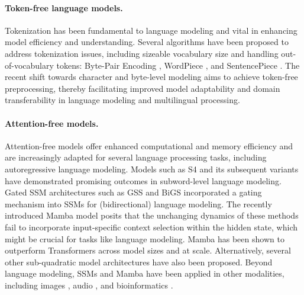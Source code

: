 \paragraph{Token-free language models.} Tokenization has been fundamental to language modeling and vital in enhancing model efficiency and understanding. Several algorithms have been proposed to address tokenization issues, including sizeable vocabulary size and handling out-of-vocabulary tokens: Byte-Pair Encoding \citep{sennrich2015neural}, WordPiece \citep{schuster2012japanese,devlin2018bert}, and SentencePiece \citep{kudo2018sentencepiece}. The recent shift towards character \citep{tay2022charformer,ma2020charbert,mielke2019spell} and byte-level \citep{yu2023megabyte,xue2022byt5,belouadi2022bygpt5} modeling aims to achieve token-free preprocessing, thereby facilitating improved model adaptability and domain transferability in language modeling and multilingual processing.

\paragraph{Attention-free models.} Attention-free models offer enhanced computational and memory efficiency and are increasingly adapted for several language processing tasks, including autoregressive language modeling. Models such as S4 \citep{gu2021efficiently} and its subsequent variants \citep{gupta2022diagonal,gu2022parameterization} have demonstrated promising outcomes in subword-level language modeling. Gated SSM architectures such as GSS \citep{mehta2023long} and BiGS \cite{wang2022pretraining} incorporated a gating mechanism into SSMs for (bidirectional) language modeling. The recently introduced Mamba model \citep{gu2023mamba} posits that the unchanging dynamics of these methods fail to incorporate input-specific context selection within the hidden state, which might be crucial for tasks like language modeling. Mamba has been shown to outperform Transformers across model sizes and at scale. Alternatively, several other sub-quadratic model architectures \citep{yang2023gated,de2024griffin,arora2023zoology,arora2024simple,fu2024monarch} have also been proposed. Beyond language modeling, SSMs and Mamba have been applied in other modalities, including images \citep{yan2023diffusion}, audio \citep{goel2022s}, and bioinformatics \citep{schiff2024caduceus}.

